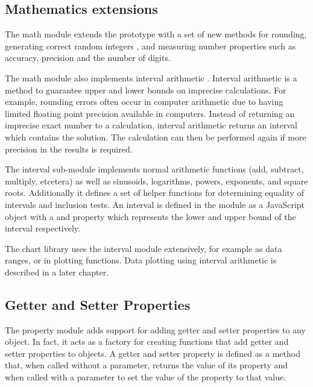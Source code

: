\subsection{Mathematics extensions}
The math module extends the  prototype with a set of new methods for rounding, generating correct random integers \cite{glassner90}, and measuring number properties such as accuracy, precision and the number of digits.

The math module also implements interval arithmetic \cite{rokne95}. Interval arithmetic is a method to guarantee upper and lower bounds on imprecise calculations. For example, rounding errors often occur in computer arithmetic due to having limited floating point precision available in computers. Instead of returning an imprecise exact number to a calculation, interval arithmetic returns an interval which contains the solution. The calculation can then be performed again if more precision in the results is required.

The interval sub-module implements normal arithmetic functions (add, subtract, multiply, etcetera) as well as sinusoids, logarithms, powers, exponents, and square roots. Additionally it defines a set of helper functions for determining equality of intervals and inclusion tests. An interval is defined in the module as a JavaScript object with a  and  property which represents the lower and upper bound of the interval respectively.

The chart library uses the interval module extensively, for example as data ranges, or in plotting functions. Data plotting using interval arithmetic is described in a later chapter.

\subsection{Getter and Setter Properties}
The property module adds support for adding getter and setter properties to any object. In fact, it acts as a factory for creating functions that add getter and setter properties to objects. A getter and setter property is defined as a method that, when called without a parameter, returns the value of its property and when called with a parameter to set the value of the property to that value.

